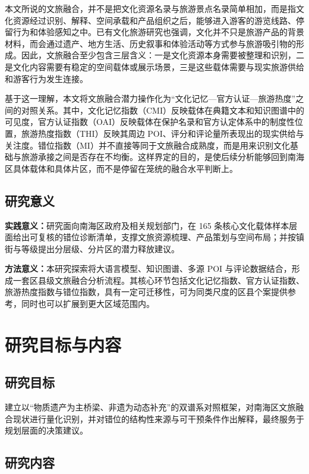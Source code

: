 本文所说的文旅融合，并不是把文化资源名录与旅游景点名录简单相加，而是指文化资源经过识别、解释、空间承载和产品组织之后，能够进入游客的游览线路、停留行为和体验感知之中。已有文化旅游研究也强调，文化并不只是旅游产品的背景材料，而会通过遗产、地方生活、历史叙事和体验活动等方式参与旅游吸引物的形成\cite{ref22,ref23}。因此，文旅融合至少包含三层含义：一是文化资源本身需要被整理和识别，二是文化内容需要有稳定的空间载体或展示场景，三是这些载体需要与现实旅游供给和游客行为发生连接。

基于这一理解，本文将文旅融合潜力操作化为``文化记忆---官方认证---旅游热度''之间的对照关系。其中，文化记忆指数（CMI）反映载体在典籍文本和知识图谱中的可见度，官方认证指数（OAI）反映载体在保护名录和官方认定体系中的制度性位置，旅游热度指数（THI）反映其周边 POI、评分和评论量所表现出的现实供给与关注度。错位指数（MI）并不直接等同于文旅融合成熟度，而是用来识别文化基础与旅游承接之间是否存在不均衡。这样界定的目的，是使后续分析能够回到南海区具体载体和具体片区，而不是停留在笼统的融合水平判断上。

\subsection{研究意义}\label{ux7814ux7a76ux610fux4e49}

\textbf{实践意义：}研究面向南海区政府及相关规划部门，在 165 条核心文化载体样本层面给出可复核的错位诊断清单，支撑文旅资源梳理、产品策划与空间布局；并按镇街与等级提出分层级、分片区的潜力释放建议。

\textbf{方法意义：}本研究探索将大语言模型、知识图谱、多源 POI 与评论数据结合，形成一套区县级文旅融合分析流程。其核心环节包括文化记忆指数、官方认证指数、旅游热度指数与错位指数，具有一定可迁移性，可为同类尺度的区县个案提供参考，同时也可以扩展到更大区域范围内。

\section{研究目标与内容}\label{ux7814ux7a76ux76eeux6807ux4e0eux5185ux5bb9}

\subsection{研究目标}\label{ux7814ux7a76ux76eeux6807}

建立以``物质遗产为主桥梁、非遗为动态补充''的双谱系对照框架，对南海区文旅融合现状进行量化识别，并对错位的结构性来源与可干预条件作出解释，最终服务于规划层面的决策建议。

\subsection{研究内容}\label{ux7814ux7a76ux5185ux5bb9}

